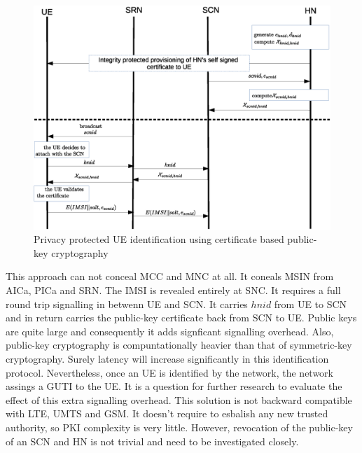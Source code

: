 \documentclass[lnicst,sechang,a4paper]{svmultln}
\begin{document}
\begin{figure}
\begin{center}
  \includegraphics[width=.98\textwidth]{public_key_variation1.eps}
\caption{Privacy protected UE identification using certificate based public-key cryptography}
\label{fig:solution_certificate}       %
\end{center}
\end{figure}

This approach can not conceal MCC and MNC at all. It coneals MSIN from AICa, PICa and SRN. The IMSI is revealed entirely at SNC. It requires a full round trip signalling in betwenn UE and SCN. It carries $hnid$ from UE to SCN and in return carries the public-key certificate back from SCN to UE. Public keys are quite large and consequently it adds signficant signalling overhead. Also, public-key cryptography is compuntationally heavier than that of symmetric-key cryptography. Surely latency will increase significantly in this identification protocol. Nevertheless, once an UE is identified by the network, the network assings a GUTI to the UE. It is a question for further research to evaluate the effect of this extra signalling overhead. This solution is not backward compatible with LTE, UMTS and GSM. It doesn't require to esbalish any new trusted authority, so PKI complexity is very little. However, revocation of the public-key of an SCN and HN is not trivial and need to be investigated closely.
\end{document}
